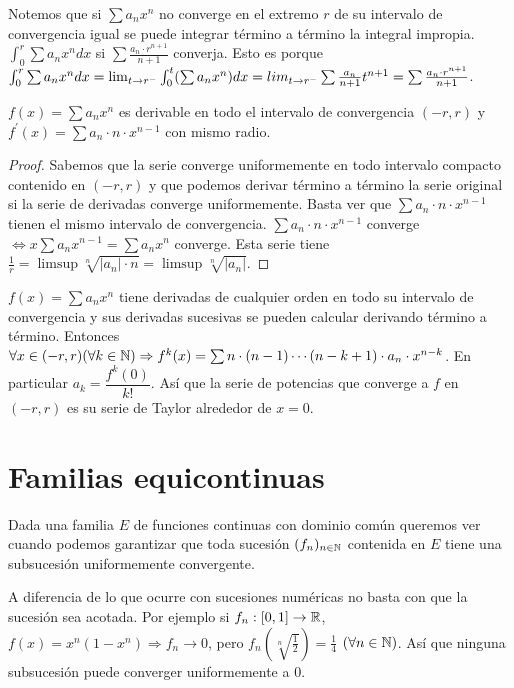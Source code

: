 Notemos que si $\sum a_n x^n$ no converge en el extremo $r$ de su intervalo de convergencia igual se puede integrar término a término la integral impropia. $\int_0^r \sum a_n x^n dx$ si $\sum \frac{a_n \cdot r^{n+1}}{n+1}$ converja.
Esto es porque $\int_0^r \sum a_n x^n dx = \lim_{t \to r^-} \int_0^t (\sum a_n x^n) dx = \\lim_{t \to r^-} \sum \frac{a_n}{n+1} t^{n+1} = \sum \frac{a_n \cdot r^{n+1}}{n+1}$.

\begin{theorem}
  $f(x) = \sum a_n x^n$ es derivable en todo el intervalo de convergencia $(-r, r)$ y $f^{\prime}(x) = \sum a_n \cdot n \cdot x^{n-1}$ con mismo radio.
  \begin{proof}
    Sabemos que la serie converge uniformemente en todo intervalo compacto contenido en $(-r, r)$ y que podemos derivar término a término la serie original si la serie de derivadas converge uniformemente.
    Basta ver que $\sum a_n \cdot n \cdot x^{n-1}$ tienen el mismo intervalo de convergencia. $\sum a_n \cdot n \cdot x^{n-1}$ converge $\iff x \sum a_n x^{n-1} = \sum a_n x^n$ converge. Esta serie tiene $\frac{1}{r} = \limsup \sqrt[n]{|a_n| \cdot n} = \limsup \sqrt[n]{|a_n|}$.
  \end{proof}
\end{theorem}

\begin{corollary}
  $f(x) = \sum a_n x^n$ tiene derivadas de cualquier orden en todo su intervalo de convergencia y sus derivadas sucesivas se pueden calcular derivando término a término. Entonces $\forall x \in (-r, r)(\forall k \in \mathbb{N}) \Rightarrow f^k(x) = \sum n \cdot (n-1) \cdots (n-k+1) \cdot a_n \cdot x^{n-k}$.
  En particular $a_k = \dfrac{f^k(0)}{k!}$. Así que la serie de potencias que converge a $f$ en $(-r, r)$ es su serie de Taylor alrededor de $x = 0$.
\end{corollary}

\section{Familias equicontinuas}

Dada una familia $E$ de funciones continuas con dominio común queremos ver cuando podemos garantizar que toda sucesión $(f_n)_{n \in \mathbb{N}}$ contenida en $E$ tiene una subsucesión uniformemente convergente.

A diferencia de lo que ocurre con sucesiones numéricas no basta con que la sucesión sea acotada. Por ejemplo si $f_n: [0, 1] \to \mathbb{R}$, $f(x) = x^n(1 - x^n) \Rightarrow f_n \to 0$, pero $f_n(\sqrt[n]{\frac{1}{2}}) = \frac{1}{4}$ $(\forall n \in \mathbb{N})$.
Así que ninguna subsucesión puede converger uniformemente a $0$.

